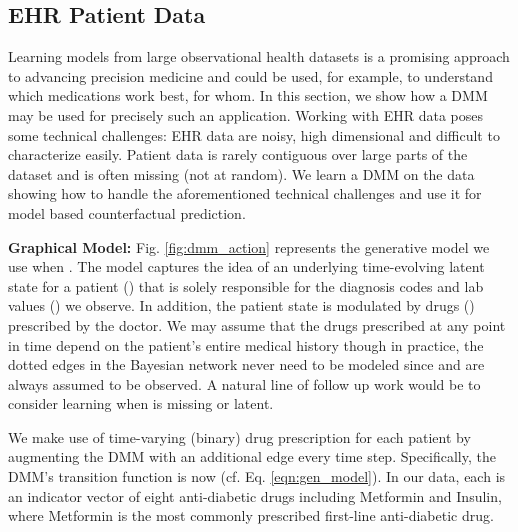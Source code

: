 \documentclass[letterpaper]{article}
\theoremstyle{plain}
\newcommand{\DMM}{DMM\xspace}
\begin{document}
{\subsection{EHR Patient Data}
Learning models from large observational
health datasets is a promising approach to advancing
precision medicine and could be used, for example, to understand which
medications work best, for whom. In this section, 
we show how a \DMM may be used for precisely such an application.
Working with EHR data poses some technical challenges: EHR data are noisy, high dimensional and difficult to characterize easily.
Patient data is rarely contiguous over large parts of the dataset and is often missing (not at random). We learn a \DMM on the data 
showing how to handle the aforementioned technical challenges and use it for model based counterfactual prediction. 

\textbf{Graphical Model: }
Fig. \ref{fig:dmm_action} represents the generative model we use when . 
The model captures the idea of an underlying time-evolving latent state for a patient () that
is solely responsible for the diagnosis codes and lab values () we observe. In addition, the patient state
is modulated by drugs () prescribed by the doctor. We may assume that the drugs prescribed at any point in time
depend on the patient's entire medical history
though in practice, the dotted edges in the Bayesian network never need to be modeled since  and  are always assumed to be observed. A natural line of follow up work would be to consider learning when  is missing or latent.  

We make use of time-varying (binary) drug prescription  for each patient
by augmenting the \DMM with an additional edge every time step. 
Specifically, the \DMM's transition function is now 
 (cf. Eq. \ref{eqn:gen_model}).
In our data, each  is an indicator vector of eight anti-diabetic drugs including Metformin and Insulin, where Metformin is the most commonly prescribed first-line anti-diabetic drug. 


}
\end{document}
